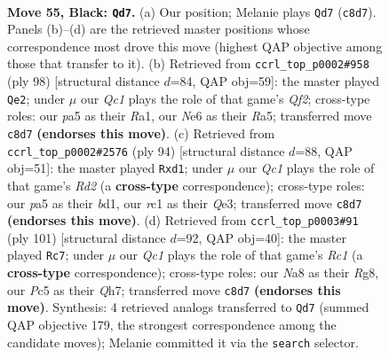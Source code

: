 \documentclass[11pt]{article}
\begin{document}
\clearpage

\begin{figure}[p]\centering
\begin{subfigure}{0.46\textwidth}\centering
\resizebox{\linewidth}{!}{%
\newchessgame
\chessboard[
  setfen={nrq3k1/4br2/p3n3/P1p2p1p/1P1p1Pp1/N5P1/QR1BP2P/2RN2K1 b - - 2 55},
  showmover=false,
  pgfstyle=straightmove, color=movearrow, markmove={c8-d7}
]}
\caption{}
\end{subfigure}\hfill
\begin{subfigure}{0.46\textwidth}\centering
\resizebox{\linewidth}{!}{%
\newchessgame
\chessboard[
  setfen={1r3r1k/1b2n1p1/2qp3p/R1p1p3/1p2N1BP/2PP1PP1/1P3Q1K/R7 w - - 25 50},
  showmover=false,
  pgfstyle=straightmove, color=movearrow, markmove={f2-e2}
]}
\caption{}
\end{subfigure}
\\[4pt]
\begin{subfigure}{0.46\textwidth}\centering
\resizebox{\linewidth}{!}{%
\newchessgame
\chessboard[
  setfen={3r1rk1/4p1n1/1q5p/1p2Ppp1/p2P3P/P3Q1P1/1P1R1RNK/3b4 w - - 0 48},
  showmover=false,
  pgfstyle=straightmove, color=movearrow, markmove={d2-d1}
]}
\caption{}
\end{subfigure}\hfill
\begin{subfigure}{0.46\textwidth}\centering
\resizebox{\linewidth}{!}{%
\newchessgame
\chessboard[
  setfen={2r3r1/p4p1q/kp2p2p/3nP2P/b1pNR1P1/P1P4K/2PBQ3/5R2 b - - 16 51},
  showmover=false,
  pgfstyle=straightmove, color=movearrow, markmove={c8-c7}
]}
\caption{}
\end{subfigure}
\caption{\textbf{Move 55, Black: \texttt{Qd7}.} (a) Our position; Melanie plays \texttt{Qd7} (\texttt{c8d7}). Panels (b)--(d) are the retrieved master positions whose correspondence most drove this move (highest QAP objective among those that transfer to it). (b) Retrieved from \texttt{ccrl\_top\_p0002\#958} (ply 98) [structural distance $d$=84, QAP obj=59]: the master played \texttt{Qe2}; under $\mu$ our \emph{Qc1} plays the role of that game's \emph{Qf2}; cross-type roles: our \emph{p}a5 as their \emph{R}a1, our \emph{N}e6 as their \emph{R}a5; transferred move \texttt{c8d7} \textbf{(endorses this move)}. (c) Retrieved from \texttt{ccrl\_top\_p0002\#2576} (ply 94) [structural distance $d$=88, QAP obj=51]: the master played \texttt{Rxd1}; under $\mu$ our \emph{Qc1} plays the role of that game's \emph{Rd2} (a \textbf{cross-type} correspondence); cross-type roles: our \emph{p}a5 as their \emph{b}d1, our \emph{r}c1 as their \emph{Q}e3; transferred move \texttt{c8d7} \textbf{(endorses this move)}. (d) Retrieved from \texttt{ccrl\_top\_p0003\#91} (ply 101) [structural distance $d$=92, QAP obj=40]: the master played \texttt{Rc7}; under $\mu$ our \emph{Qc1} plays the role of that game's \emph{Rc1} (a \textbf{cross-type} correspondence); cross-type roles: our \emph{N}a8 as their \emph{R}g8, our \emph{P}c5 as their \emph{Q}h7; transferred move \texttt{c8d7} \textbf{(endorses this move)}. Synthesis: 4 retrieved analogs transferred to \texttt{Qd7} (summed QAP objective 179, the strongest correspondence among the candidate moves); Melanie committed it via the \texttt{search} selector.}
\label{fig:thought-m109}
\end{figure}
\end{document}
